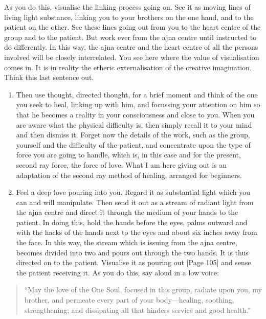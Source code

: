 \documentclass[
]{book}
\begin{document}
As you do this, visualise the linking process going on. See it as moving lines of living light substance, linking you to your brothers on the one hand, and to the patient on the other. See these lines going out from you to the heart centre of the group and to the patient. But work ever from the ajna centre until instructed to do differently. In this way, the ajna centre and the heart centre of all the persons involved will be closely interrelated. You see here where the value of visualisation comes in. It is in reality the etheric externalisation of the creative imagination. Think this last sentence out.

\begin{enumerate}
\def\labelenumi{\arabic{enumi}.}
\setcounter{enumi}{3}
\item
  Then use thought, directed thought, for a brief moment and think of the one you seek to heal, linking up with him, and focussing your attention on him so that he becomes a reality in your consciousness and close to you. When you are aware what the physical difficulty is, then simply recall it to your mind and then dismiss it. Forget now the details of the work, such as the group, yourself and the difficulty of the patient, and concentrate upon the type of force you are going to handle, which is, in this case and for the present, second ray force, the force of love. What I am here giving out is an adaptation of the second ray method of healing, arranged for beginners.
\item
  Feel a deep love pouring into you. Regard it as substantial light which you can and will manipulate. Then send it out as a stream of radiant light from the ajna centre and direct it through the medium of your hands to the patient. In doing this, hold the hands before the eyes, palms outward and with the hacks of the hands next to the eyes and about six inches away from the face. In this way, the stream which is issuing from the ajna centre, becomes divided into two and pours out through the two hands. It is thus directed on to the patient. Visualise it as pouring out {[}Page 105{]} and sense the patient receiving it. As you do this, say aloud in a low voice:
\end{enumerate}

\begin{quote}
``May the love of the One Soul, focused in this group, radiate upon you, my brother, and permeate every part of your body---healing, soothing, strengthening; and dissipating all that hinders service and good health.''
\end{quote}
\end{document}
